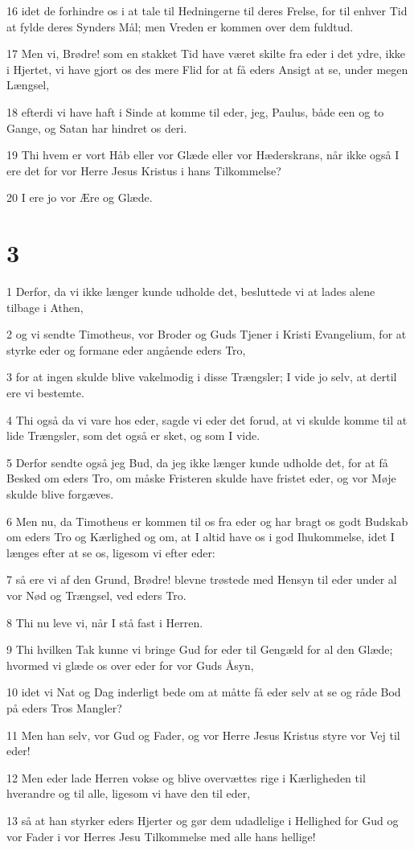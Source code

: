 \par 16 idet de forhindre os i at tale til Hedningerne til deres Frelse, for til enhver Tid at fylde deres Synders Mål; men Vreden er kommen over dem fuldtud.
\par 17 Men vi, Brødre! som en stakket Tid have været skilte fra eder i det ydre, ikke i Hjertet, vi have gjort os des mere Flid for at få eders Ansigt at se, under megen Længsel,
\par 18 efterdi vi have haft i Sinde at komme til eder, jeg, Paulus, både een og to Gange, og Satan har hindret os deri.
\par 19 Thi hvem er vort Håb eller vor Glæde eller vor Hæderskrans, når ikke også I ere det for vor Herre Jesus Kristus i hans Tilkommelse?
\par 20 I ere jo vor Ære og Glæde.

\chapter{3}

\par 1 Derfor, da vi ikke længer kunde udholde det, besluttede vi at lades alene tilbage i Athen,
\par 2 og vi sendte Timotheus, vor Broder og Guds Tjener i Kristi Evangelium, for at styrke eder og formane eder angående eders Tro,
\par 3 for at ingen skulde blive vakelmodig i disse Trængsler; I vide jo selv, at dertil ere vi bestemte.
\par 4 Thi også da vi vare hos eder, sagde vi eder det forud, at vi skulde komme til at lide Trængsler, som det også er sket, og som I vide.
\par 5 Derfor sendte også jeg Bud, da jeg ikke længer kunde udholde det, for at få Besked om eders Tro, om måske Fristeren skulde have fristet eder, og vor Møje skulde blive forgæves.
\par 6 Men nu, da Timotheus er kommen til os fra eder og har bragt os godt Budskab om eders Tro og Kærlighed og om, at I altid have os i god Ihukommelse, idet I længes efter at se os, ligesom vi efter eder:
\par 7 så ere vi af den Grund, Brødre! blevne trøstede med Hensyn til eder under al vor Nød og Trængsel, ved eders Tro.
\par 8 Thi nu leve vi, når I stå fast i Herren.
\par 9 Thi hvilken Tak kunne vi bringe Gud for eder til Gengæld for al den Glæde; hvormed vi glæde os over eder for vor Guds Åsyn,
\par 10 idet vi Nat og Dag inderligt bede om at måtte få eder selv at se og råde Bod på eders Tros Mangler?
\par 11 Men han selv, vor Gud og Fader, og vor Herre Jesus Kristus styre vor Vej til eder!
\par 12 Men eder lade Herren vokse og blive overvættes rige i Kærligheden til hverandre og til alle, ligesom vi have den til eder,
\par 13 så at han styrker eders Hjerter og gør dem udadlelige i Hellighed for Gud og vor Fader i vor Herres Jesu Tilkommelse med alle hans hellige!

